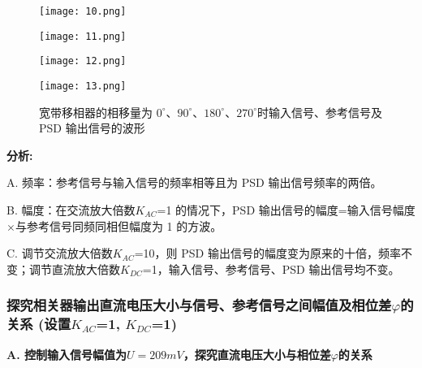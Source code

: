 \documentclass{whureport}
\begin{document}
\begin{multicols}{2}
\begin{figure}[H]
    \centering
    \texttt{[image: 10.png]}
    \label{example}
\end{figure}
\begin{figure}[H]
    \centering
    \texttt{[image: 11.png]}
    \label{example}
\end{figure}
\begin{figure}[H]
    \centering
    \texttt{[image: 12.png]}
    \label{example}
\end{figure}
\begin{figure}[H]
    \centering
    \texttt{[image: 13.png]}
    \caption{宽带移相器的相移量为 $0^\circ$、$90^\circ$、$180^\circ$、$270^\circ$时输入信号、参考信号及 PSD 输出信号的波形}	
    \label{example}
\end{figure}

\textbf{分析:}

A. 频率：参考信号与输入信号的频率相等且为 PSD 输出信号频率的两倍。

B. 幅度：在交流放大倍数$K_{AC}$=1 的情况下，PSD 输出信号的幅度=输入信号幅度$\times$与参考信号同频同相但幅度为 1 的方波。

C. 调节交流放大倍数$K_{AC}$=10，则 PSD 输出信号的幅度变为原来的十倍，频率不变；调节直流放大倍数$K_{DC}$=1，输入信号、参考信号、PSD 输出信号均不变。

\subsubsection{探究相关器输出直流电压大小与信号、参考信号之间幅值及相位差$\varphi$的关系 (设置$K_{AC}$=1, $K_{DC}$=1)}
\textbf{A. 控制输入信号幅值为$U = 209 mV$，探究直流电压大小与相位差$\varphi$的关系}


\end{multicols}
\end{document}
